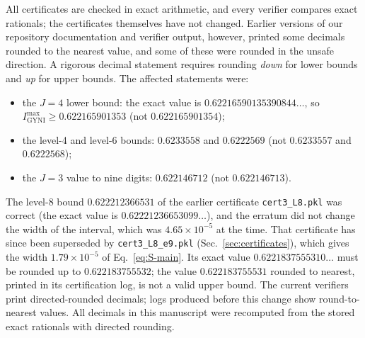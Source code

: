 \documentclass[aps,pra,onecolumn,notitlepage,superscriptaddress,longbibliography,nofootinbib,11pt]{revtex4-2}
\theoremstyle{remark}
\newcommand{\Imax}{I_{\mathrm{GYNI}}^{\max}}
\newcommand{\file}[1]{\texttt{#1}}
\begin{document}
All certificates are checked in exact arithmetic, and every verifier compares exact rationals; the certificates themselves have not changed. Earlier versions of our repository documentation and verifier output, however, printed some decimals rounded to the nearest value, and some of these were rounded in the unsafe direction. A rigorous decimal statement requires rounding \emph{down} for lower bounds and \emph{up} for upper bounds. The affected statements were:
\begin{itemize}
\item the $J=4$ lower bound: the exact value is $0.62216590135390844\ldots$, so $\Imax\ge0.622165901353$ (not $0.622165901354$);
\item the level-4 and level-6 bounds: $0.6233558$ and $0.6222569$ (not $0.6233557$ and $0.6222568$);
\item the $J=3$ value to nine digits: $0.622146712$ (not $0.622146713$).
\end{itemize}
The level-8 bound $0.622212366531$ of the earlier certificate \file{cert3\_L8.pkl} was correct (the exact value is $0.62221236653099\ldots$), and the erratum did not change the width of the interval, which was $4.65\times10^{-5}$ at the time. That certificate has since been superseded by \file{cert3\_L8\_e9.pkl} (Sec.~\ref{sec:certificates}), which gives the width $1.79\times10^{-5}$ of Eq.~\eqref{eq:S-main}. Its exact value $0.6221837555310\ldots$ must be rounded up to $0.622183755532$; the value $0.622183755531$ rounded to nearest, printed in its certification log, is not a valid upper bound. The current verifiers print directed-rounded decimals; logs produced before this change show round-to-nearest values. All decimals in this manuscript were recomputed from the stored exact rationals with directed rounding.


\end{document}
